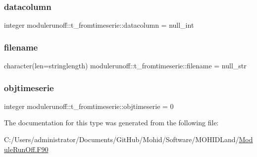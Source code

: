 \subsubsection{\texorpdfstring{datacolumn}{datacolumn}}
{\footnotesize\ttfamily integer modulerunoff\+::t\+\_\+fromtimeserie\+::datacolumn = null\+\_\+int\hspace{0.3cm}{\ttfamily [private]}}

\mbox{\label{structmodulerunoff_1_1t__fromtimeserie_aecdb0da7adab0730fd09213e9c3f89ba}} 
\subsubsection{\texorpdfstring{filename}{filename}}
{\footnotesize\ttfamily character(len=stringlength) modulerunoff\+::t\+\_\+fromtimeserie\+::filename = null\+\_\+str\hspace{0.3cm}{\ttfamily [private]}}

\mbox{\label{structmodulerunoff_1_1t__fromtimeserie_ad88a24c8e7435455578414b01837576c}} 
\subsubsection{\texorpdfstring{objtimeserie}{objtimeserie}}
{\footnotesize\ttfamily integer modulerunoff\+::t\+\_\+fromtimeserie\+::objtimeserie = 0\hspace{0.3cm}{\ttfamily [private]}}



The documentation for this type was generated from the following file\+:\begin{DoxyCompactItemize}
\item 
C\+:/\+Users/administrator/\+Documents/\+Git\+Hub/\+Mohid/\+Software/\+M\+O\+H\+I\+D\+Land/\mbox{\hyperlink{_module_run_off_8_f90}{Module\+Run\+Off.\+F90}}\end{DoxyCompactItemize}
